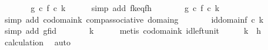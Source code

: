 \begin{isabellebody}
\ \ \isamarkupfalse%
\ \isamarkupfalse%
\ {\isachardoublequoteopen}{\isachardot}{\kern0pt}{\isachardot}{\kern0pt}{\isachardot}{\kern0pt}\ {\isacharequal}{\kern0pt}\ g\ {\isasymcirc}\isactrlsub c\ {\isacharparenleft}{\kern0pt}f\ {\isasymcirc}\isactrlsub c\ k{\isacharparenright}{\kern0pt}{\isachardoublequoteclose}\isanewline
\ \ \ \ \isamarkupfalse%
\ {\isacharparenleft}{\kern0pt}simp\ add{\isacharcolon}{\kern0pt}\ fk{\isacharunderscore}{\kern0pt}eq{\isacharunderscore}{\kern0pt}fh{\isacharparenright}{\kern0pt}\isanewline
\ \ \isamarkupfalse%
\ \isamarkupfalse%
\ {\isachardoublequoteopen}{\isachardot}{\kern0pt}{\isachardot}{\kern0pt}{\isachardot}{\kern0pt}\ {\isacharequal}{\kern0pt}\ {\isacharparenleft}{\kern0pt}g\ {\isasymcirc}\isactrlsub c\ f{\isacharparenright}{\kern0pt}\ {\isasymcirc}\isactrlsub c\ k{\isachardoublequoteclose}\isanewline
\ \ \ \ \isamarkupfalse%
\ {\isacharparenleft}{\kern0pt}simp\ add{\isacharcolon}{\kern0pt}\ codomain{\isacharunderscore}{\kern0pt}k\ comp{\isacharunderscore}{\kern0pt}associative\ domain{\isacharunderscore}{\kern0pt}g{\isacharparenright}{\kern0pt}\isanewline
\ \ \isamarkupfalse%
\ \isamarkupfalse%
\ {\isachardoublequoteopen}{\isachardot}{\kern0pt}{\isachardot}{\kern0pt}{\isachardot}{\kern0pt}\ {\isacharequal}{\kern0pt}\ id{\isacharparenleft}{\kern0pt}domain{\isacharparenleft}{\kern0pt}f{\isacharparenright}{\kern0pt}{\isacharparenright}{\kern0pt}\ {\isasymcirc}\isactrlsub c\ k{\isachardoublequoteclose}\isanewline
\ \ \ \ \isamarkupfalse%
\ {\isacharparenleft}{\kern0pt}simp\ add{\isacharcolon}{\kern0pt}\ gf{\isacharunderscore}{\kern0pt}id{\isacharparenright}{\kern0pt}\isanewline
\ \ \isamarkupfalse%
\ \isamarkupfalse%
\ {\isachardoublequoteopen}{\isachardot}{\kern0pt}{\isachardot}{\kern0pt}{\isachardot}{\kern0pt}\ {\isacharequal}{\kern0pt}\ k{\isachardoublequoteclose}\isanewline
\ \ \ \ \isamarkupfalse%
\ {\isacharparenleft}{\kern0pt}metis\ codomain{\isacharunderscore}{\kern0pt}k\ id{\isacharunderscore}{\kern0pt}left{\isacharunderscore}{\kern0pt}unit{\isacharparenright}{\kern0pt}\isanewline
\ \ \isamarkupfalse%
\ \isamarkupfalse%
\ {\isachardoublequoteopen}k\ {\isacharequal}{\kern0pt}\ h{\isachardoublequoteclose}\isanewline
\ \ \ \ \isamarkupfalse%
\ calculation\ \isamarkupfalse%
\ auto\isanewline
{}\isamarkupfalse%
%
\endisatagproof
{\isafoldproof}%

\end{isabellebody}
